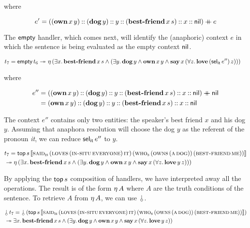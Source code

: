 where

$$
e' = ((\textbf{own}\,x\,y) \mathbin{::} (\textbf{dog}\,y) \mathbin{::} y \mathbin{::}
(\textbf{best-friend}\,x\,s) \mathbin{::} x \mathbin{::} \textsf{nil}) \mathbin{+\mkern-10mu+} e
$$

The $\textsf{empty}$ handler, which comes next, will identify the (anaphoric)
context $e$ in which the sentence is being evaluated as the empty context
$\textsf{nil}$.

\begin{align*}
  t_7 = \textsf{empty}\,t_6 \twoheadrightarrow \
  &\eta\,(\exists x.\, \textbf{best-friend}\,x\,s \land
          (\exists y.\, \textbf{dog}\,y \land \textbf{own}\,x\,y \land
           \textbf{say}\,x\,(\forall z.\, \textbf{love}\,(\textsf{sel}_{\textsf{it}}\,e'')\,z)))
\end{align*}

where

\begin{align*}
e'' &= ((\textbf{own}\,x\,y) \mathbin{::} (\textbf{dog}\,y) \mathbin{::} y \mathbin{::}
(\textbf{best-friend}\,x\,s) \mathbin{::} x \mathbin{::} \textsf{nil}) \mathbin{+\mkern-10mu+} \textsf{nil} \\
    &= (\textbf{own}\,x\,y) \mathbin{::} (\textbf{dog}\,y) \mathbin{::} y \mathbin{::}
(\textbf{best-friend}\,x\,s) \mathbin{::} x \mathbin{::} \textsf{nil}
\end{align*}

The context $e''$ contains only two entities: the speaker's best friend $x$
and his dog $y$. Assuming that anaphora resolution will choose the dog $y$
as the referent of the pronoun \emph{it}, we can reduce $\textsf{sel}_{\textsf{it}}\,e''$
to $y$.

\begin{align*}
  &t_7 = \textsf{top}\,s\,\llbracket \textsc{said}_{\textsc{is}}\,(\textsc{loves}\,(\textsc{in-situ}\,\textsc{everyone})\,\textsc{it})\,(\textsc{who}_{\textsc{s}}\,(\textsc{owns}\,(\textsc{a}\,\textsc{dog}))\,(\textsc{best-friend}\,\textsc{me})) \rrbracket \\
  &\twoheadrightarrow \eta\,(\exists x.\, \textbf{best-friend}\,x\,s \land
              (\exists y.\, \textbf{dog}\,y \land \textbf{own}\,x\,y \land
               \textbf{say}\,x\,(\forall z.\, \textbf{love}\,y\,z)))
\end{align*}

By applying the $\textsf{top}\,s$ composition of handlers, we have interpreted
away all the operations. The result is of the form $\eta\,A$ where $A$ are
the truth conditions of the sentence. To retrieve $A$ from $\eta\,A$, we
can use $\cherry$.

\begin{align*}
& \ap{\cherry}{t_7} = \ap{\cherry}{(\app{\TOP}{s}{\sem{\app{\abs{said}_{\abs{is}}}{(\app{\abs{loves}}{(\ap{\abs{in-situ}}{\abs{everyone}})}{\abs{it}})}{(\app{\abs{who}_{\abs{s}}}{(\ap{\abs{owns}}{(\ap{\abs{a}}{\abs{dog}})})}{(\ap{\abs{best-friend}}{\abs{me}})})}}})} \\
& \tto \exists x.\, \app{\obj{best-friend}}{x}{s} \land (\exists y.\, \ap{\obj{dog}}{y} \land \app{\obj{own}}{x}{y} \land \app{\obj{say}}{x}{(\forall z.\, \app{\obj{love}}{y}{z})})
\end{align*}
